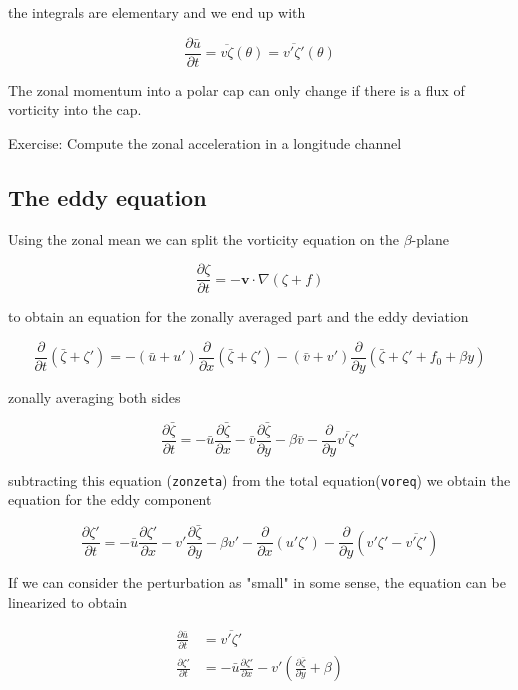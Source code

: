 the integrals are elementary and we end up with

\[\frac{\partial \bar{u}}{\partial t} = \overline{v \zeta}(\theta) =\overline{v'\zeta'}(\theta)\]

The zonal momentum into a polar cap can only change if there is a flux
of vorticity into the cap.

Exercise: Compute the zonal acceleration in a longitude channel

\subsection{The eddy equation}\label{the-eddy-equation}

Using the zonal mean we can split the vorticity equation on the
\(\beta\)-plane

\[\frac{\partial \zeta}{\partial t} = -\mathbf{v}\cdot\nabla(\zeta + f)\]

to obtain an equation for the zonally averaged part and the eddy
deviation

{\[\frac{\partial }{\partial t}(\bar{\zeta}+\zeta') = -(\bar{u}+u')\frac{\partial }{\partial x}(\bar{\zeta}+\zeta')-(\bar{v}+v')\frac{\partial }{\partial y}(\bar{\zeta}+\zeta'+f_0 +\beta y)\]}

zonally averaging both sides

{\[\frac{\partial \bar{\zeta}}{\partial t} = -\bar{u}\frac{\partial \bar{\zeta}}{\partial x}-\bar{v}\frac{\partial \bar{\zeta}}{\partial y}  -\beta\bar{v}- \frac{\partial }{\partial y}\overline{v'\zeta'}\]}

subtracting this equation (\texttt{zonzeta}) from the total
equation(\texttt{voreq}) we obtain the equation for the eddy component

{\[\frac{\partial \zeta'}{\partial t} = -\bar{u}\frac{\partial \zeta'}{\partial x} -v'\frac{\partial \bar{\zeta}}{\partial y}-\beta v'-\frac{\partial }{\partial x}(u'\zeta')-\frac{\partial }{\partial y}(v'\zeta'-\overline{v'\zeta'})\]}

If we can consider the perturbation as "small" in some sense, the
equation can be linearized to obtain

\[\begin{aligned}
\frac{\partial \bar{u}}{\partial t} &=\overline{v'\zeta'} \\  
\frac{\partial \zeta'}{\partial t} &= -\bar{u}\frac{\partial \zeta'}{\partial x} -v'( \frac{\partial \bar{\zeta}}{\partial y}+\beta)
\end{aligned}\]

